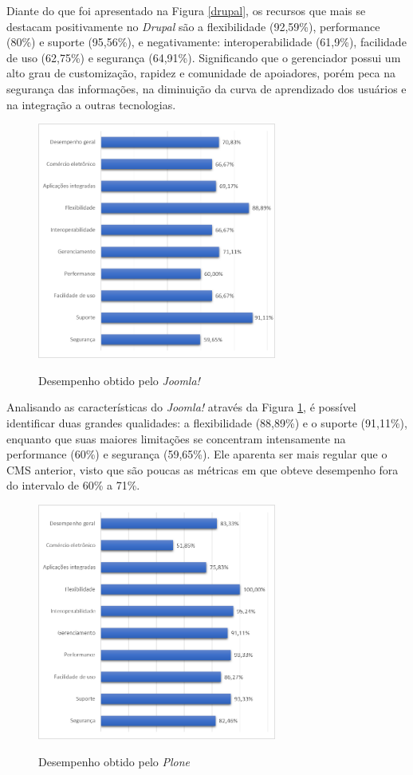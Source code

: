 Diante do que foi apresentado na Figura \ref{drupal}, os recursos que mais se destacam positivamente no \textit{Drupal} são a flexibilidade (92,59\%), performance (80\%) e suporte (95,56\%), e negativamente: interoperabilidade (61,9\%), facilidade de uso (62,75\%) e segurança (64,91\%). Significando que o gerenciador possui um alto grau de customização, rapidez e comunidade de apoiadores, porém peca na segurança das informações, na diminuição da curva de aprendizado dos usuários e na integração a outras tecnologias.
\newpage

\begin{figure}[htb]
 \centering
 \caption{Desempenho obtido pelo \textit{Joomla!}}
 \includegraphics[width=0.7\textwidth]{figuras/desempenho-joomla}
 \label{joomla}
\end{figure}

Analisando as características do \textit{Joomla!} através da Figura \ref{joomla}, é possível identificar duas grandes qualidades: a flexibilidade (88,89\%) e o suporte (91,11\%), enquanto que suas maiores limitações se concentram intensamente na performance (60\%) e segurança (59,65\%). Ele aparenta ser mais regular que o CMS anterior, visto que são poucas as métricas em que obteve desempenho fora do intervalo de 60\% a 71\%.   
\newpage
\begin{figure}[htb]
 \centering
 \caption{Desempenho obtido pelo \textit{Plone}}
 \includegraphics[width=0.7\textwidth]{figuras/desempenho-plone}
 \label{plone}
\end{figure}

